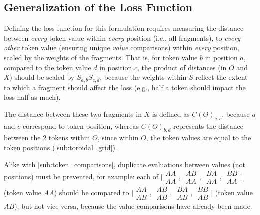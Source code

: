 \subsection{Generalization of the Loss Function}%
\label{sub:generalization_of_the_loss_function}
Defining the loss function for this formulation requires measuring the distance between \emph{every} token value within \emph{every} position (i.e., all fragments), to \emph{every other} token value (ensuring unique \emph{value} comparisons) within \emph{every} position, scaled by the weights of the fragments. That is, for token value $b$ in position $a$, compared to the token value $d$ in position $c$, the product of distances (in $O$ and $X$) should be scaled by $S_{a,b}S_{c,d}$, because the weights within $S$ reflect the extent to which a fragment should affect the loss (e.g., half a token should impact the loss half as much).

The distance between these two fragments in $X$ is defined as $C(O)_{a,c}$, because $a$ and $c$ correspond to token position, whereas $C(O)_{b,d}$ represents the distance between the 2 tokens within $O$, since within $O$, the token values are equal to the token positions (\autoref{sub:toroidal_grid}).

Alike with \autoref{sub:token_comparisons}, duplicate evaluations between values (not positions) must be prevented, for example: each of %
[$\begin{smallmatrix}AA\\AA\end{smallmatrix}$,%
$\begin{smallmatrix}AB\\AA\end{smallmatrix}$,%
$\begin{smallmatrix}BA\\AA\end{smallmatrix}$,%
$\begin{smallmatrix}BB\\AA\end{smallmatrix}$] (token value $AA$) should be compared to
[$\begin{smallmatrix}AA\\AB\end{smallmatrix}$,%
$\begin{smallmatrix}AB\\AB\end{smallmatrix}$,%
$\begin{smallmatrix}BA\\AB\end{smallmatrix}$,%
$\begin{smallmatrix}BB\\AB\end{smallmatrix}$] (token value $AB$), but not vice versa, because the value comparisons have already been made.

